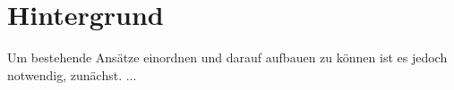 \section{Hintergrund}
\label{sec-2}
\begin{comment}
\begin{center}
	\fbox{
		\parbox{0.9\linewidth}{
			\textit{Ziel des Kapitels:}\\
			Hintergründe der Arbeit in 3 Abschnitten: HoloLens Technik, AR in Education und Physik Hintergründe.\\
	}}\\
\end{center}
\end{comment}
Um bestehende Ansätze einordnen und darauf aufbauen zu können ist es jedoch notwendig, zunächst. ...


